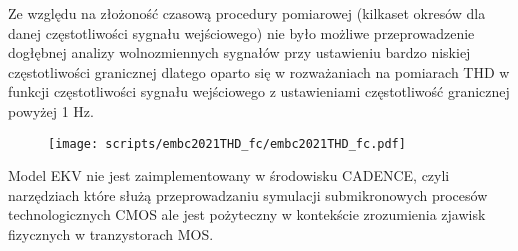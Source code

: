 \begin{frame}[t]
    \begin{block}{\tb}
    \end{block}
    Ze względu na złożoność czasową procedury pomiarowej (kilkaset okresów dla danej częstotliwości sygnału wejściowego) nie było możliwe przeprowadzenie dogłębnej analizy wolnozmiennych sygnałów przy ustawieniu bardzo niskiej częstotliwości granicznej dlatego oparto się w rozważaniach na pomiarach THD w funkcji częstotliwości sygnału wejściowego z ustawieniami częstotliwość granicznej powyżej 1 Hz.
    
    \begin{figure}[H]
        \centering
        \texttt{[image: scripts/embc2021THD\_fc/embc2021THD\_fc.pdf]}  
    \end{figure}





\end{frame}
\begin{frame}[t]
    \begin{block}{\tb}
    \end{block}


    Model EKV nie jest zaimplementowany w środowisku CADENCE, czyli narzędziach które służą przeprowadzaniu symulacji submikronowych procesów technologicznych CMOS ale jest pożyteczny w kontekście zrozumienia zjawisk fizycznych w tranzystorach MOS. 
\end{frame}

